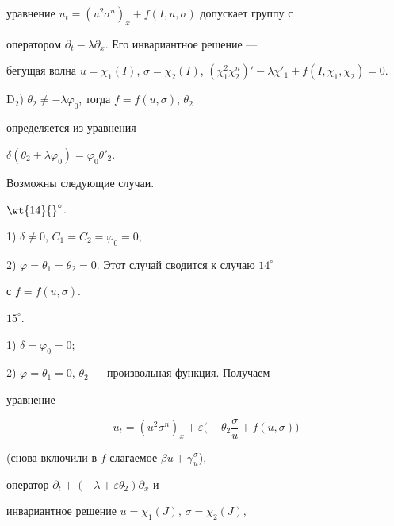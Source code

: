 уравнение $u_t=(u^2\sigma^n)_x+f(I,u,\sigma)$ допускает группу с 


оператором $\partial_t-\lambda\partial_x$. Его инвариантное решение --- 


бегущая волна $u=\chi_1(I)$, $\sigma=\chi_2(I)$, $(\chi^2_1\chi^n_2)'- 


\lambda\chi'_1+f(I,\chi_1,\chi_2)=0$. 


 


D$_2$) $\theta_2\ne-\lambda\varphi_0$, тогда $f=f(u,\sigma)$, $\theta_2$ 


определяется из уравнения 


$\delta(\theta_2+\lambda\varphi_0)=\varphi_0\theta'_2$. 


Возможны следующие случаи. 


 


\noindent{}$\wt {14}{}^\circ$. 


 


1) $\delta\ne0$, $C_1=C_2=\varphi_0=0$; 


 


2) $\varphi=\theta_1=\theta_2=0$. Этот случай сводится к случаю $14^\circ$


с $f=f(u,\sigma)$. 


 


\noindent{}$15^\circ$. 


 


1) $\delta=\varphi_0=0$; 


 


2) $\varphi=\theta_1=0$, $\theta_2$ --- произвольная функция. Получаем 


уравнение 


\begin{equation} 


u_t=(u^2\sigma^n)_x+\varepsilon\bigg(-\theta_2\frac{\sigma}{u} 


+f(u,\sigma)\bigg) \tag{3.18} 


\end{equation} 


(снова включили в $f$ слагаемое $\beta u+\gamma\frac{\sigma}{u}$), 


оператор $\partial_t+(-\lambda+\varepsilon\theta_2)\partial_x$ и 


инвариантное решение $u=\chi_1(J)$, $\sigma=\chi_2(J)$, 


